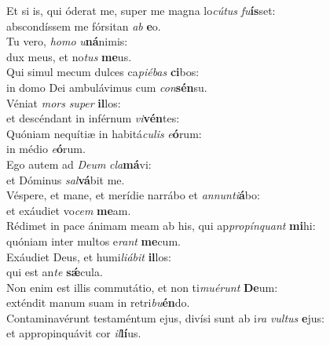 \oddverse Et si is, qui óderat me, super me magna lo\textit{cú}\textit{tus} \textit{fu}\textbf{ís}set:~\*\\
\oddverse abscondíssem me fórsitan \textit{ab} \textbf{e}o.\\
\evenverse Tu vero, \textit{ho}\textit{mo} \textit{u}\textbf{ná}nimis:~\*\\
\evenverse dux meus, et no\textit{tus} \textbf{me}us.\\
\oddverse Qui simul mecum dulces ca\textit{pi}\textit{é}\textit{bas} \textbf{ci}bos:~\*\\
\oddverse in domo Dei ambulávimus cum \textit{con}\textbf{sén}su.\\
\evenverse Véniat \textit{mors} \textit{su}\textit{per} \textbf{il}los:~\*\\
\evenverse et descéndant in inférnum \textit{vi}\textbf{vén}tes:\\
\oddverse Quóniam nequítiæ in habitá\textit{cu}\textit{lis} \textit{e}\textbf{ó}rum:~\*\\
\oddverse in médio \textit{e}\textbf{ó}rum.\\
\evenverse Ego autem ad \textit{De}\textit{um} \textit{cla}\textbf{má}vi:~\*\\
\evenverse et Dóminus \textit{sal}\textbf{vá}bit me.\\
\oddverse Véspere, et mane, et merídie narrábo et \textit{an}\textit{nun}\textit{ti}\textbf{á}bo:~\*\\
\oddverse et exáudiet vo\textit{cem} \textbf{me}am.\\
\evenverse Rédimet in pace ánimam meam ab his, qui ap\textit{pro}\textit{pín}\textit{quant} \textbf{mi}hi:~\*\\
\evenverse quóniam inter multos e\textit{rant} \textbf{me}cum.\\
\oddverse Exáudiet Deus, et humi\textit{li}\textit{á}\textit{bit} \textbf{il}los:~\*\\
\oddverse qui est an\textit{te} \textbf{sǽ}cula.\\
\evenverse Non enim est illis commutátio, et non ti\textit{mu}\textit{é}\textit{runt} \textbf{De}um:~\*\\
\evenverse exténdit manum suam in retri\textit{bu}\textbf{én}do.\\
\oddverse Contaminavérunt testaméntum ejus, divísi sunt ab i\textit{ra} \textit{vul}\textit{tus} \textbf{e}jus:~\*\\
\oddverse et appropinquávit cor \textit{il}\textbf{lí}us.\\

